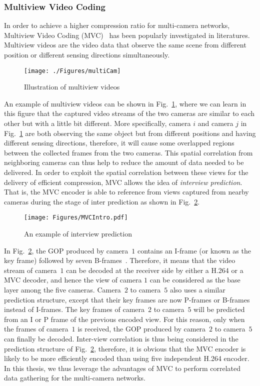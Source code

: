 \subsubsection{Multiview Video Coding}
\label{sec::MultiviewIntro}
%
In order to achieve a higher compression ratio for multi-camera networks, Multiview Video Coding (MVC)~\cite{MVCoverview} has been popularly investigated in literatures.
Multiview videos are the video data that observe the same scene from different position or different sensing directions simultaneously.
%
\begin{figure}
\begin{center}
\texttt{[image: ./Figures/multiCam]}
\caption{\label{fig::multiCam}Illustration of multiview videos}
\end{center}
\end{figure}
%
An example of multiview videos can be shown in Fig.~\ref{fig::multiCam}, where we can learn in this figure that the captured video streams of the two cameras are similar to each other but with a little bit different.
More specifically, camera $i$ and camera $j$ in Fig.~\ref{fig::multiCam} are both observing the same object but from different positions and having different sensing directions, therefore, it will cause some overlapped regions between the collected frames from the two cameras.
This spatial correlation from neighboring cameras can thus help to reduce the amount of data needed to be delivered.
In order to exploit the spatial correlation between these views for the delivery of efficient compression, MVC allows the idea of \emph{interview prediction}.
That is, the MVC encoder is able to reference from views captured from nearby cameras during the stage of inter prediction as shown in Fig.~\ref{fig::MVC}.
%
\begin{figure}
\centering
\texttt{[image: Figures/MVCIntro.pdf]}
\caption{An example of interview prediction\label{fig::MVC}}
\end{figure}
%

In Fig.~\ref{fig::MVC}, the GOP produced by camera~$1$ contains an I-frame (or known as the key frame) followed by seven B-frames~\cite{HierarchicalBs}.
Therefore, it means that the video stream of camera~$1$ can be decoded at the receiver side by either a H.264 or a MVC decoder, and hence the view of camera $1$ can be considered as the base layer among the five cameras.
Camera~$2$ to camera~$5$ also uses a similar prediction structure, except that their key frames are now P-frames or B-frames instead of I-frames.
The key frames of camera~$2$ to camera~$5$ will be predicted from an I or P frame of the previous encoded view.
For this reason, only when the frames of camera~$1$ is received, the GOP produced by camera~$2$ to camera~$5$ can finally be decoded.
Inter-view correlation is thus being considered in the prediction structure of Fig.~\ref{fig::MVC}, therefore, it is obvious that the MVC encoder is likely to be more efficiently encoded than using five independent H.264 encoder.
In this thesis, we thus leverage the advantages of MVC to perform correlated data gathering for the multi-camera networks.